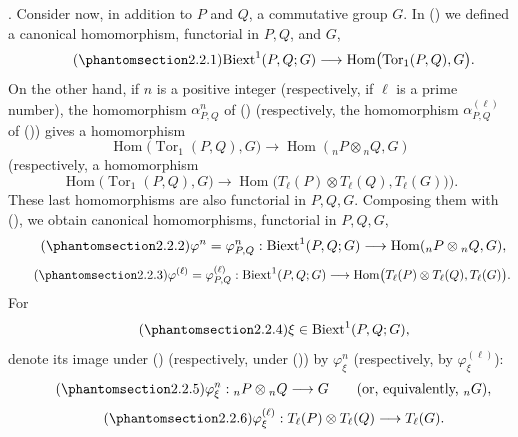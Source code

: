 
. Consider now, in addition to $P$ and $Q$, a commutative group
$G$.  In () we defined a canonical homomorphism, functorial in
$P,Q$, and $G$,
\begin{equation}\tag{\SGARefTarget{sga7.sga7i.eviii.n2-2-1}{2.2.1}}
 \mathrm{Biext}^1(P,Q;G)
 \longrightarrow
 \operatorname{Hom}\bigl(\operatorname{Tor}_1(P,Q),G\bigr).
\end{equation}
On the other hand, if $n$ is a positive integer (respectively, if
$\ell$ is a prime number), the homomorphism $\alpha^n_{P,Q}$ of
() (respectively, the homomorphism $\alpha^{(\ell)}_{P,Q}$ of
()) gives a homomorphism
\[
 \operatorname{Hom}\bigl(\operatorname{Tor}_1(P,Q),G\bigr)
 \longrightarrow
 \operatorname{Hom}({}_nP\otimes{}_nQ,G)
\]
(respectively, a homomorphism
\[
 \operatorname{Hom}\bigl(\operatorname{Tor}_1(P,Q),G\bigr)
 \longrightarrow
 \operatorname{Hom}\bigl(
   T_\ell(P)\otimes T_\ell(Q),T_\ell(G)
 \bigr)).
\]
These last homomorphisms are also functorial in $P,Q,G$.
Composing them with (), we obtain canonical homomorphisms,
functorial in $P,Q,G$,
\begin{equation}\tag{\SGARefTarget{sga7.sga7i.eviii.n2-2-2}{2.2.2}}
 \varphi^n=\varphi^n_{P,Q}:
 \mathrm{Biext}^1(P,Q;G)
 \longrightarrow
 \operatorname{Hom}({}_nP\otimes{}_nQ,G),
\end{equation}
\begin{equation}\tag{\SGARefTarget{sga7.sga7i.eviii.n2-2-3}{2.2.3}}
 \varphi^{(\ell)}=\varphi^{(\ell)}_{P,Q}:
 \mathrm{Biext}^1(P,Q;G)
 \longrightarrow
 \operatorname{Hom}\bigl(
   T_\ell(P)\otimes T_\ell(Q),T_\ell(G)
 \bigr).
\end{equation}
For
\begin{equation}\tag{\SGARefTarget{sga7.sga7i.eviii.n2-2-4}{2.2.4}}
 \xi\in\mathrm{Biext}^1(P,Q;G),
\end{equation}
denote its image under () (respectively, under ()) by
$\varphi^n_\xi$ (respectively, by $\varphi^{(\ell)}_\xi$):
\begin{equation}\tag{\SGARefTarget{sga7.sga7i.eviii.n2-2-5}{2.2.5}}
 \varphi^n_\xi:{}_nP\otimes{}_nQ
 \longrightarrow G
 \qquad\text{(or, equivalently, }{}_nG\text{)},
\end{equation}
\begin{equation}\tag{\SGARefTarget{sga7.sga7i.eviii.n2-2-6}{2.2.6}}
 \varphi^{(\ell)}_\xi:
 T_\ell(P)\otimes T_\ell(Q)
 \longrightarrow T_\ell(G).
\end{equation}


